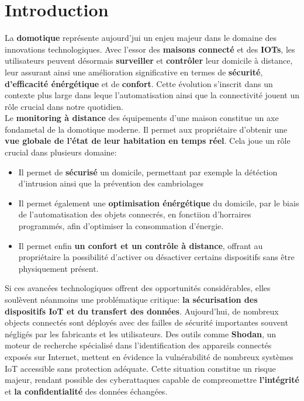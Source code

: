 \documentclass[10pt, a4paper]{report}
\begin{document}
	\chapter{Introduction}
		La \textbf{domotique} représente aujourd'jui un enjeu majeur dans le domaine des innovations technologiques. Avec l'essor des \textbf{maisons connecté} et des \textbf{IOTs}, les utilisateurs peuvent désormais \textbf{surveiller} et \textbf{contrôler} leur domicile à distance, leur assurant ainsi une amélioration significative en termes de \textbf{sécurité}, \textbf{d'efficacité énérgétique} et de \textbf{confort}. Cette évolution s'inscrit dans un contexte plus large dans leque l'automatisation ainsi que la connectivité jouent un rôle crucial dans notre quotidien.\\
		Le \textbf{monitoring à distance} des équipements d'une maison constitue un axe fondametal de la domotique moderne. Il permet aux propriétaire d'obtenir une \textbf{vue globale de l'état de leur habitation en temps réel}. Cela joue un rôle crucial dans plusieurs domaine:\\
		\begin{itemize}
			\item Il permet de \textbf{sécurisé} un domicile, permettant par exemple la détéction d'intrusion ainsi que la prévention des cambriolages
			
			\item Il permet également une \textbf{optimisation énérgétique} du domicile, par le biais de l'automatisation des objets connecrés, en fonctiion d'horraires programmés, afin d'optimiser la consommation d'énergie.
			
			\item Il permet enfin \textbf{un confort et un contrôle à distance}, offrant au propriétaire la possibilité d'activer ou désactiver certains dispositifs sans être physiquement présent.
		\end{itemize}
		Si ces avancées technologiques offrent des opportunités considérables, elles soulèvent néanmoins une problématique critique: \textbf{la sécurisation des dispositifs IoT et du transfert des données}. Aujourd'hui, de nombreux objects connectés sont déployés avec des failles de sécurité importantes souvent négligés par les fabricants et les utilisateurs. Des outils comme \textbf{Shodan}, un moteur de recherche spécialisé dans l'identification des appareils connectés exposés sur Internet, mettent en évidence la vulnérabilité de nombreux systèmes IoT accessible sans protection adéquate. Cette situation constitue un risque majeur, rendant possible des cyberattaques capable de compreomettre \textbf{l'intégrité} et \textbf{la confidentialité} des données échangées.\\
\end{document}
